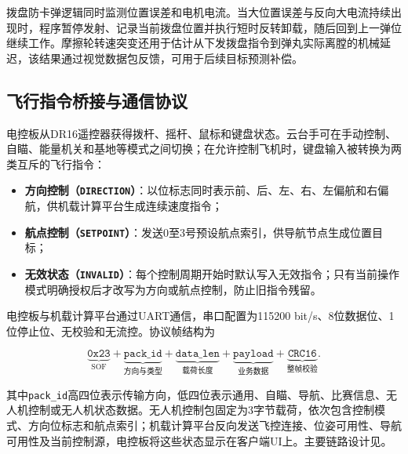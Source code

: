 拨盘防卡弹逻辑同时监测位置误差和电机电流。当大位置误差与反向大电流持续出现时，程序暂停发射、记录当前拨盘位置并执行短时反转卸载，随后回到上一弹位继续工作。摩擦轮转速突变还用于估计从下发拨盘指令到弹丸实际离膛的机械延迟，该结果通过视觉数据包反馈，可用于后续目标预测补偿。

\subsection{飞行指令桥接与通信协议}

电控板从DR16遥控器获得拨杆、摇杆、鼠标和键盘状态。云台手可在手动控制、自瞄、能量机关和基地等模式之间切换；在允许控制飞机时，键盘输入被转换为两类互斥的飞行指令：

\begin{itemize}
    \item \textbf{方向控制（\texttt{DIRECTION}）}：以位标志同时表示前、后、左、右、左偏航和右偏航，供机载计算平台生成连续速度指令；
    \item \textbf{航点控制（\texttt{SETPOINT}）}：发送0至3号预设航点索引，供导航节点生成位置目标；
    \item \textbf{无效状态（\texttt{INVALID}）}：每个控制周期开始时默认写入无效指令；只有当前操作模式明确授权后才改写为方向或航点控制，防止旧指令残留。
\end{itemize}

电控板与机载计算平台通过UART通信，串口配置为115200 bit/s、8位数据位、1位停止位、无校验和无流控。协议帧结构为

\begin{equation}
    \underbrace{\texttt{0x23}}_{\mathrm{SOF}}
    +\underbrace{\texttt{pack\_id}}_{\text{方向与类型}}
    +\underbrace{\texttt{data\_len}}_{\text{载荷长度}}
    +\underbrace{\texttt{payload}}_{\text{业务数据}}
    +\underbrace{\texttt{CRC16}}_{\text{整帧校验}} .
    \label{equ:drone_cv_uart_frame}
\end{equation}

其中\texttt{pack\_id}高四位表示传输方向，低四位表示通用、自瞄、导航、比赛信息、无人机控制或无人机状态数据。无人机控制包固定为3字节载荷，依次包含控制模式、方向位标志和航点索引；机载计算平台反向发送飞控连接、位姿可用性、导航可用性及当前控制源，电控板将这些状态显示在客户端UI上。主要链路设计见。

